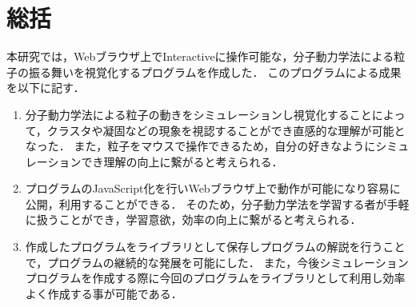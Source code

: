 \chapter{総括}
本研究では，Webブラウザ上でInteractiveに操作可能な，分子動力学法による粒子の振る舞いを視覚化するプログラムを作成した．
このプログラムによる成果を以下に記す．

\begin{enumerate}
  \item 分子動力学法による粒子の動きをシミュレーションし視覚化することによって，クラスタや凝固などの現象を視認することができ直感的な理解が可能となった．
また，粒子をマウスで操作できるため，自分の好きなようにシミュレーションでき理解の向上に繋がると考えられる．
  \item プログラムのJavaScript化を行いWebブラウザ上で動作が可能になり容易に公開，利用することができる．
そのため，分子動力学法を学習する者が手軽に扱うことができ，学習意欲，効率の向上に繋がると考えられる．
  \item 作成したプログラムをライブラリとして保存しプログラムの解説を行うことで，プログラムの継続的な発展を可能にした．
また，今後シミュレーションプログラムを作成する際に今回のプログラムをライブラリとして利用し効率よく作成する事が可能である．
\end{enumerate}



